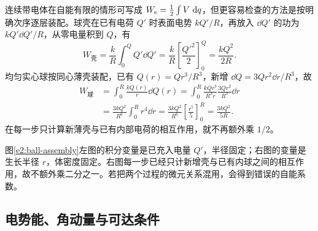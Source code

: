 连续带电体在自能有限的情形可写成 $W_{\rm e}=\frac12\int V\,\mathop{}\!\mathrm d q$，但更容易检查的方法是按明确次序逐层装配。球壳在已有电荷 $Q'$ 时表面电势 $kQ'/R$，再放入 $\dd Q'$ 的功为 $kQ'\dd Q'/R$，从零电量积到 $Q$，有
\[
 W_{\text{壳}}=\frac kR\int_0^Q Q'\dd Q'
 =\frac kR\left[\frac{Q'^2}{2}\right]_0^Q
 =\frac{kQ^2}{2R}.
\]均匀实心球按同心薄壳装配，已有 $Q(r)=Qr^3/R^3$，新增 $\dd Q=3Qr^2\dd r/R^3$，故
\[
 \begin{aligned}
 W_{\text{球}}
 &=\int_0^R\frac{kQ(r)}r\dd Q(r)
 =\int_0^R\frac{kQr^3}{R^3r}\frac{3Qr^2}{R^3}\dd r\\
 &=\frac{3kQ^2}{R^6}\int_0^Rr^4\dd r
 =\frac{3kQ^2}{R^6}\left[\frac{r^5}{5}\right]_0^R
 =\frac{3kQ^2}{5R}.
\end{aligned}
\]
在每一步只计算新薄壳与已有内部电荷的相互作用，就不再额外乘 $1/2$。


图\ref{e2:ball-assembly}左图的积分变量是已充入电量 $Q'$，半径固定；右图的变量是生长半径 $r$，体密度固定。右图每一步已经只计新增壳与已有内球之间的相互作用，故不额外乘二分之一。若把两个过程的微元关系混用，会得到错误的自能系数。

\subsection{电势能、角动量与可达条件}

